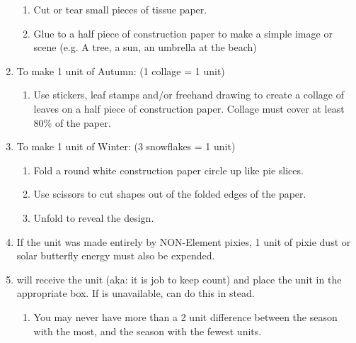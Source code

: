 \documentclass[green]{PP}
\begin{document}
\begin{enumerate}
	\begin{enumerate}
		\item Cut or tear small pieces of tissue paper.
		\item Glue to a half piece of construction paper to make a simple image or scene (e.g. A tree, a sun, an umbrella at the beach)
	\end{enumerate}
	\item To make 1 unit of Autumn: (1 collage = 1 unit)
	\begin{enumerate}
		\item Use stickers, leaf stamps and/or freehand drawing to create a collage of leaves on a half piece of construction paper. Collage must cover at least 80\% of the paper.
	\end{enumerate}
	\item To make 1 unit of Winter: (3 snowflakes = 1 unit)
	\begin{enumerate}
		\item Fold a round white construction paper circle up like pie slices.
		\item Use scissors to cut shapes out of the folded edges of the paper.
		\item Unfold to reveal the design.
	\end{enumerate}
	\item If the unit was made entirely by NON-Element pixies, 1 unit of pixie dust or solar butterfly energy must also be expended.
	\item \cEHead{} will receive the unit (aka: it is \cEHead{\their} job to keep count) and place the unit in the appropriate box. If \cEHead{} is unavailable, \cSHead{} can do this in \cEHead{\their} stead.
	\begin{enumerate}
		\item You may never have more than a 2 unit difference between the season with the most, and the season with the fewest units.
	\end{enumerate}
\end{enumerate}
\end{document}
